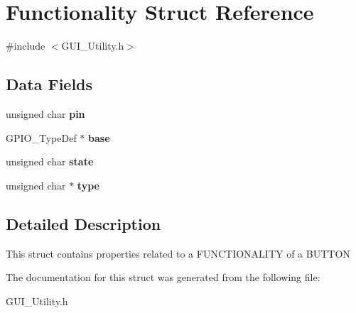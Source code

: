 \hypertarget{struct_functionality}{}\section{Functionality Struct Reference}
\label{struct_functionality}


{\ttfamily \#include $<$G\+U\+I\+\_\+\+Utility.\+h$>$}

\subsection*{Data Fields}
\begin{DoxyCompactItemize}
\item 
\mbox{\label{struct_functionality_acac83c43d4334d17c67df7309e41d5d3}} 
unsigned char {\bfseries pin}
\item 
\mbox{\label{struct_functionality_a63a7c8ffab34a981a09ce4022b440a73}} 
G\+P\+I\+O\+\_\+\+Type\+Def $\ast$ {\bfseries base}
\item 
\mbox{\label{struct_functionality_a71a761720c78c2930925bbcb358bbb68}} 
unsigned char {\bfseries state}
\item 
\mbox{\label{struct_functionality_aafe8921682cd3b66ba8d9ef844265c74}} 
unsigned char $\ast$ {\bfseries type}
\end{DoxyCompactItemize}


\subsection{Detailed Description}
This struct contains properties related to a F\+U\+N\+C\+T\+I\+O\+N\+A\+L\+I\+TY of a B\+U\+T\+T\+ON 

The documentation for this struct was generated from the following file\+:\begin{DoxyCompactItemize}
\item 
G\+U\+I\+\_\+\+Utility.\+h\end{DoxyCompactItemize}
